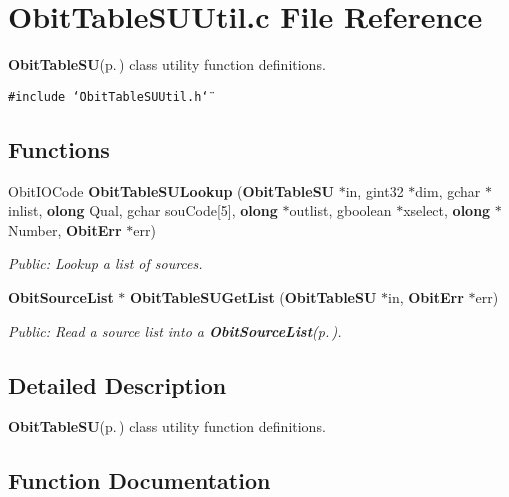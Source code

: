 \section{Obit\-Table\-SUUtil.c File Reference}
\label{ObitTableSUUtil_8c}
{\bf Obit\-Table\-SU}{\rm (p.\,\pageref{structObitTableSU})} class utility function definitions. 

{\tt \#include \char`\"{}Obit\-Table\-SUUtil.h\char`\"{}}\par
\subsection*{Functions}
\begin{CompactItemize}
\item 
Obit\-IOCode {\bf Obit\-Table\-SULookup} ({\bf Obit\-Table\-SU} $\ast$in, gint32 $\ast$dim, gchar $\ast$inlist, {\bf olong} Qual, gchar sou\-Code[5], {\bf olong} $\ast$outlist, gboolean $\ast$xselect, {\bf olong} $\ast$Number, {\bf Obit\-Err} $\ast$err)
\begin{CompactList}\small\item\em Public: Lookup a list of sources. \item\end{CompactList}\item 
{\bf Obit\-Source\-List} $\ast$ {\bf Obit\-Table\-SUGet\-List} ({\bf Obit\-Table\-SU} $\ast$in, {\bf Obit\-Err} $\ast$err)
\begin{CompactList}\small\item\em Public: Read a source list into a {\bf Obit\-Source\-List}{\rm (p.\,\pageref{structObitSourceList})}. \item\end{CompactList}\end{CompactItemize}


\subsection{Detailed Description}
{\bf Obit\-Table\-SU}{\rm (p.\,\pageref{structObitTableSU})} class utility function definitions. 



\subsection{Function Documentation}
